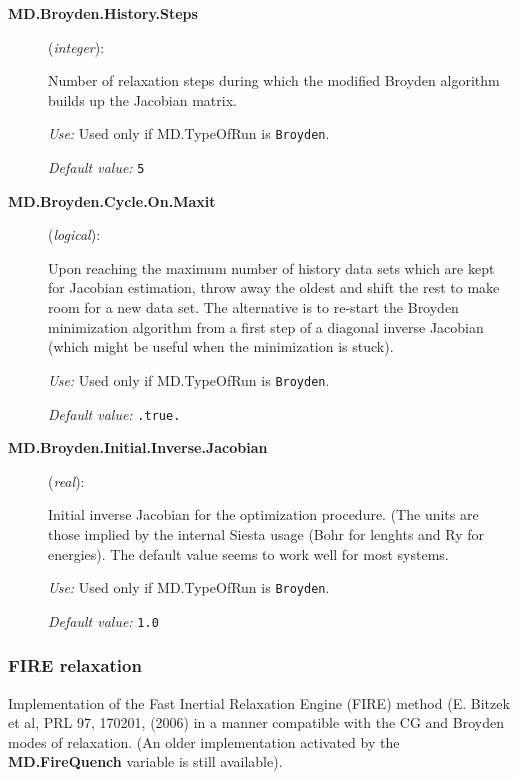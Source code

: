 \documentclass[11pt]{article}
\begin{document}
\begin{description}
\item [{\bf MD.Broyden.History.Steps}] ({\it integer}):

Number of relaxation steps during which the modified Broyden algorithm
builds up the Jacobian matrix.

{\it Use:} Used only if MD.TypeOfRun is {\tt Broyden}.

{\it Default value:} {\tt 5}

\item [{\bf MD.Broyden.Cycle.On.Maxit}] ({\it logical}):

Upon reaching the maximum number of history data sets which are kept
for Jacobian estimation, throw away the oldest and shift the rest to
make room for a new data set. The alternative is to re-start the
Broyden minimization algorithm from a first step of a diagonal inverse
Jacobian (which might be useful when the minimization is
stuck).

{\it Use:} Used only if MD.TypeOfRun is {\tt Broyden}.

{\it Default value:} {\tt .true.}

\item[{\bf MD.Broyden.Initial.Inverse.Jacobian}] ({\it real}):

Initial inverse Jacobian for the optimization procedure. (The units
are those implied by the internal Siesta usage (Bohr for lenghts and
Ry for energies). The default value seems to work well for most systems.

{\it Use:} Used only if MD.TypeOfRun is {\tt Broyden}.

{\it Default value:} {\tt 1.0}


\end{description}

\subsubsection{FIRE relaxation}

Implementation of the  Fast Inertial Relaxation
Engine (FIRE) method (E. Bitzek et al, PRL 97, 170201, (2006) in a
manner compatible with the CG and Broyden modes of relaxation. (An
older implementation activated by the {\bf MD.FireQuench} variable is
still available).
\end{document}
